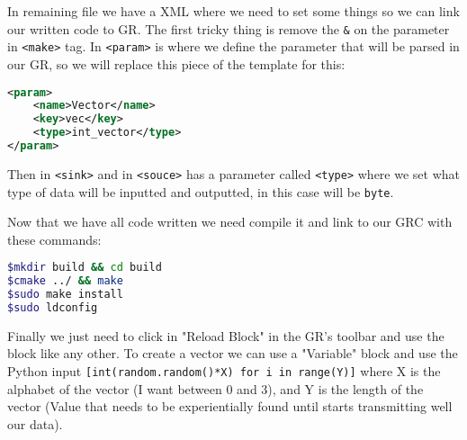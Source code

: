 \documentclass[a4paper, 10pt, conference]{ieeeconf}      %
\begin{document}
    In remaining file we have a XML where we need to set some things so we can link our written code to GR. The first tricky thing is remove the \verb|&| on the parameter in \verb|<make>| tag. 
    In \verb|<param>| is where we define the parameter that will be parsed in our GR, so we will replace this piece of the template for this:
\begin{lstlisting}[language=xml, breaklines]
<param>
    <name>Vector</name>
    <key>vec</key>
    <type>int_vector</type>
</param>
\end{lstlisting}
    Then in \verb|<sink>| and in \verb|<souce>| has a parameter called \verb|<type>| where we set what type of data will be inputted and outputted, in this case will be \verb|byte|.

    Now that we have all code written we need compile it and link to our GRC with these commands:
    
\begin{lstlisting}[language=bash, breaklines]
$mkdir build && cd build
$cmake ../ && make
$sudo make install
$sudo ldconfig
\end{lstlisting}
    
    Finally we just need to click in "Reload Block" in the GR's toolbar and use the block like any other. To create a vector we can use a "Variable" block and use the Python input \verb|[int(random.random()*X) for i in range(Y)]| where X is the alphabet of the vector (I want between 0 and 3), and Y is the length of the vector (Value that needs to be experientially found until starts transmitting well our data).
    
\end{document}
